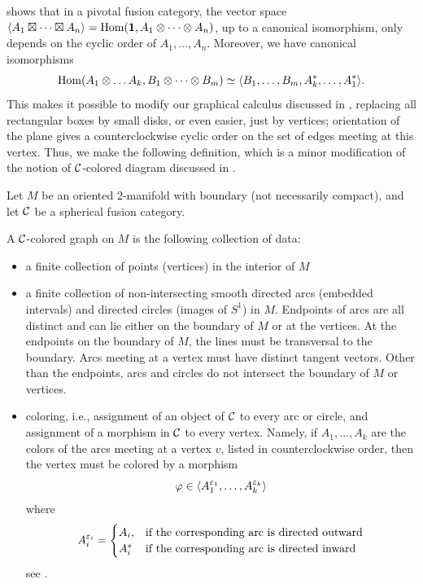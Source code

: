 shows that in a pivotal fusion category, the vector
space $\langle A_1\boxtimes\dots\boxtimes A_n\rangle=\operatorname{Hom}(\mathbf{1}, A_1\otimes\dots\otimes
A_n)$, up to a canonical isomorphism, only depends on the cyclic order of $A_1,
\dots, A_n$. Moreover, we have canonical isomorphisms
$$
   \operatorname{Hom}(A_1\otimes \dots A_k, B_1\otimes\dots\otimes B_m)\simeq
   \langle B_1, \dots, B_m,
  A_k^*,\dots, A_1^*\rangle.
$$
This makes it possible to modify our graphical calculus discussed in
, replacing all rectangular boxes by small disks, or even
easier, just by vertices; orientation of the plane gives a counterclockwise
cyclic order on the set of edges meeting at this vertex. Thus, we make the
following definition, which is a minor modification of the notion of
$\mathcal{C}$-colored diagram discussed in .
\begin{definition}\label{d:colored-graph}
  Let $M$ be an oriented 2-manifold with boundary (not necessarily compact), and
  let $\mathcal{C}$ be a spherical fusion category.

  A $\mathcal{C}$-colored graph on $M$ is the following collection of data:
  \begin{itemize}
    \item a finite collection of points (vertices) in the interior of $M$

    \item a finite collection of non-intersecting smooth directed arcs (embedded
    intervals) and directed circles (images of $S^1$) in $M$. Endpoints of arcs
    are all distinct and can lie either on the boundary of $M$ or at the
    vertices. At the endpoints on the boundary of $M$, the lines must be
    transversal to the boundary. Arcs meeting at a vertex must have distinct
    tangent vectors. Other than the endpoints, arcs and circles do not intersect
    the boundary of $M$ or vertices.

    \item coloring, i.e., assignment of an object of $\mathcal{C}$ to every arc or
    circle, and assignment of a morphism in $\mathcal{C}$ to every vertex. Namely, if
    $A_1, \dots, A_k$ are the colors of the arcs meeting at a vertex $v$, listed
    in counterclockwise order, then the vertex must be colored by a morphism
    $$
      \varphi\in \langle
        A_1^{\varepsilon_1},\dots, A_k^{\varepsilon_k}\rangle
    $$
    where
    \begin{equation}\label{e:signed-object2}
      A_i^{\varepsilon_i} =\begin{cases}
                   A_i, & \text{if the corresponding arc is directed outward}\\
                   A_i^* &\text{if the corresponding arc is directed inward}
                   \end{cases}
    \end{equation}
    see .
  \end{itemize}


\end{definition}

